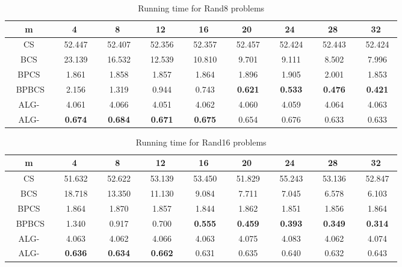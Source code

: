 \documentclass{llncs}
\newcommand{\rom}[1]{\uppercase\expandafter{\romannumeral #1\relax}}
\begin{document}
{\begin{table}
\begin{center}
\begin{tabular}{|c|c|c|c|c|c|c|c|c|}
\hline
m&4&8&12&16&20&24&28&32\\
\hline
CS &~ 52.447~ &~ 52.407~ &~ 52.356~ &~ 52.357~ &~ 52.457~ &~ 52.424~ &~ 52.443~ &~ 52.424~ \\
\hline
BCS &~ 23.139~ &~ 16.532~ &~ 12.539~ &~ 10.810~ &~ 9.701~ &~ 9.111~ &~ 8.502~ &~ 7.996~ \\
\hline
BPCS &~ 1.861~ &~ 1.858~ &~ 1.857~ &~ 1.864~ &~ 1.896~ &~ 1.905~ &~ 2.001~ &~ 1.853~ \\
\hline
~ BPBCS~ &~ 2.156~ &~ 1.319~ &~ 0.944~ &~ 0.743~ &~ \textbf{0.621}~ &~ \textbf{0.533}~ &~ \textbf{0.476}~ &~ \textbf{0.421}~ \\
\hline 
ALG-\rom{2} &~ 4.061~ &~ 4.066~ &~ 4.051~ &~ 4.062~ &~ 4.060~ &~ 4.059~ &~ 4.064~ &~ 4.063~ \\
\hline
ALG-\rom{1} &~ \textbf{0.674}~ &~ \textbf{0.684}~ &~ \textbf{0.671}~ &~ \textbf{0.675}~ &~ 0.654~ &~ 0.676~ &~ 0.633~ &~ 0.633~ \\
\hline
\end{tabular}
\caption{Running time for Rand8 problems}
\label{Rand8}
\end{center}
\end{table}

\begin{table}
\begin{center}
\begin{tabular}{|c|c|c|c|c|c|c|c|c|}
\hline
m&4&8&12&16&20&24&28&32\\
\hline
CS &~ 51.632~ &~ 52.622~ &~ 53.139~ &~ 53.450~ &~ 51.829~ &~ 55.243~ &~ 53.136~ &~ 52.847~ \\
\hline
BCS &~ 18.718~ &~ 13.350~ &~ 11.130~ &~ 9.084~ &~ 7.711~ &~ 7.045~ &~ 6.578~ &~ 6.103~ \\
\hline
BPCS &~ 1.864~ &~ 1.870~ &~ 1.857~ &~ 1.844~ &~ 1.862~ &~ 1.851~ &~ 1.856~ &~ 1.864~ \\
\hline
~ BPBCS~ &~ 1.340~ &~ 0.917~ &~ 0.700~ &~ \textbf{0.555}~ &~ \textbf{0.459}~ &~ \textbf{0.393}~ &~ \textbf{0.349}~ &~ \textbf{0.314}~ \\
\hline 
ALG-\rom{2} &~ 4.063~ &~ 4.062~ &~ 4.066~ &~ 4.063~ &~ 4.075~ &~ 4.083~ &~ 4.062~ &~ 4.074~ \\
\hline
ALG-\rom{1} &~ \textbf{0.636}~ &~ \textbf{0.634}~ &~ \textbf{0.662}~ &~ 0.631~ &~ 0.635~ &~ 0.640~ &~ 0.632~ &~ 0.643~ \\
\hline
\end{tabular}
\caption{Running time for Rand16 problems}
\label{Rand16}
\end{center}
\end{table}




}
\end{document}
